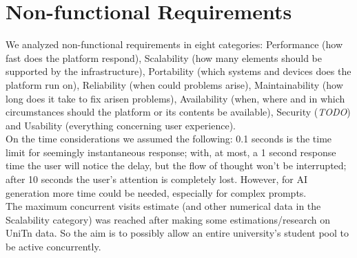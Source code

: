 \section{Non-functional Requirements} \label{non-functional-requirements}
We analyzed non-functional requirements in eight categories: Performance (how fast does the platform respond), Scalability (how many elements should be supported by the infrastructure), Portability (which systems and devices does the platform run on), Reliability (when could problems arise), Maintainability (how long does it take to fix arisen problems), Availability (when, where and in which circumstances should the platform or its contents be available), Security (\textit{TODO}) and Usability (everything concerning user experience). \\
On the time considerations we assumed the following: 0.1 seconds is the time limit for seemingly instantaneous response; with, at most, a 1 second response time the user will notice the delay, but the flow of thought won’t be interrupted; after 10 seconds the user's attention is completely lost. However, for AI generation more time could be needed, especially for complex prompts. \\
The maximum concurrent visits estimate (and other numerical data in the Scalability category) was reached after making some estimations/research on UniTn data. So the aim is to possibly allow an entire university's student pool to be active concurrently.\\

